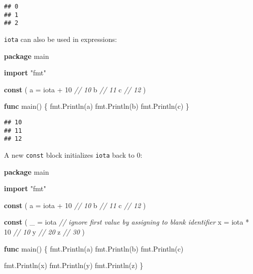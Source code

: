 \documentclass[]{book}
\newenvironment{Shaded}{\begin{snugshade}}{\end{snugshade}}
\newcommand{\CommentTok}[1]{\textcolor[rgb]{0.56,0.35,0.01}{\textit{#1}}}
\newcommand{\DecValTok}[1]{\textcolor[rgb]{0.00,0.00,0.81}{#1}}
\newcommand{\KeywordTok}[1]{\textcolor[rgb]{0.13,0.29,0.53}{\textbf{#1}}}
\newcommand{\NormalTok}[1]{#1}
\newcommand{\OtherTok}[1]{\textcolor[rgb]{0.56,0.35,0.01}{#1}}
\newcommand{\StringTok}[1]{\textcolor[rgb]{0.31,0.60,0.02}{#1}}
\begin{document}
\begin{verbatim}
## 0
## 1
## 2
\end{verbatim}

\texttt{iota} can also be used in expressions:

\begin{Shaded}
\begin{Highlighting}[]
\KeywordTok{package}\NormalTok{ main}

\KeywordTok{import} \StringTok{"fmt"}

\KeywordTok{const}\NormalTok{ (}
\NormalTok{    a = }\OtherTok{iota}\NormalTok{ + }\DecValTok{10} \CommentTok{// 10}
\NormalTok{    b             }\CommentTok{// 11}
\NormalTok{    c             }\CommentTok{// 12}
\NormalTok{)}

\KeywordTok{func}\NormalTok{ main() \{}
\NormalTok{    fmt.Println(a)}
\NormalTok{    fmt.Println(b)}
\NormalTok{    fmt.Println(c)}
\NormalTok{\}}
\end{Highlighting}
\end{Shaded}

\begin{verbatim}
## 10
## 11
## 12
\end{verbatim}

A new \texttt{const} block initializes \texttt{iota} back to 0:

\begin{Shaded}
\begin{Highlighting}[]
\KeywordTok{package}\NormalTok{ main}

\KeywordTok{import} \StringTok{"fmt"}

\KeywordTok{const}\NormalTok{ (}
\NormalTok{    a = }\OtherTok{iota}\NormalTok{ + }\DecValTok{10} \CommentTok{// 10}
\NormalTok{    b             }\CommentTok{// 11}
\NormalTok{    c             }\CommentTok{// 12}
\NormalTok{)}

\KeywordTok{const}\NormalTok{ (}
\NormalTok{    _ = }\OtherTok{iota}      \CommentTok{// ignore first value by assigning to blank identifier}
\NormalTok{    x = }\OtherTok{iota}\NormalTok{ * }\DecValTok{10} \CommentTok{// 10}
\NormalTok{    y             }\CommentTok{// 20}
\NormalTok{    z             }\CommentTok{// 30}
\NormalTok{)}

\KeywordTok{func}\NormalTok{ main() \{}
\NormalTok{    fmt.Println(a)}
\NormalTok{    fmt.Println(b)}
\NormalTok{    fmt.Println(c)}

\NormalTok{    fmt.Println(x)}
\NormalTok{    fmt.Println(y)}
\NormalTok{    fmt.Println(z)}
\NormalTok{\}}
\end{Highlighting}
\end{Shaded}
\end{document}
